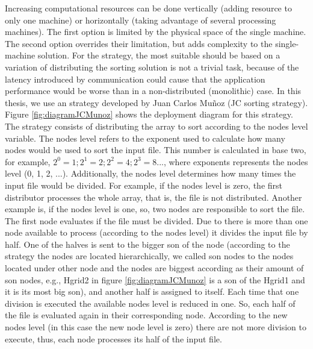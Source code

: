 Increasing computational resources can be done vertically (adding resource to only one machine)  or horizontally (taking advantage of several processing machines). The first option is limited by the physical space of the single machine. The second option overrides their limitation, but adds complexity to the single-machine solution. For the strategy, the most suitable should be based on a variation of distributing the sorting solution is not a trivial task, because of the latency introduced by communication could cause that the application performance would be worse than in a non-distributed (monolithic) case. In this thesis, we use an strategy developed by Juan Carlos Mu\~{n}oz (JC sorting strategy). Figure \ref{fig:diagramJCMunoz} shows the deployment diagram for this strategy. The strategy consists of distributing the array to sort according to the nodes level variable. The nodes level refers to the exponent used to calculate how many nodes would be used to sort the input file. This number is calculated in base two, for example, $2 ^{0} = 1 ; 2 ^{1} = 2; 2 ^{2} = 4 ; 2 ^{3} = 8... $, where exponents represents the nodes level (0, 1, 2, ...). Additionally, the nodes level determines how many times the input file would be divided. For example, if the nodes level is zero, the first distributor processes the whole array, that is, the file is not distributed. Another example is, if the nodes level is one, so, two nodes are responsible to sort the file. The first node evaluates if the file must be divided. Due to there is more than one node available to process (according to the nodes level) it divides the input file by half. One of the halves is sent to the bigger son of the node (according to the strategy the nodes are located hierarchically, we called son nodes to the nodes located under  other node and the nodes are biggest according as their amount of son nodes, e.g., Hgrid2 in figure \ref{fig:diagramJCMunoz} is a son of the Hgrid1 and it is its most big son), and another half is assigned to itself. Each time that one division is executed the available nodes level is reduced in one. So, each half of the file is evaluated again in their corresponding node. According to the new nodes level (in this case the new node level is zero) there are not more division to execute, thus, each node processes its half of the input file.

